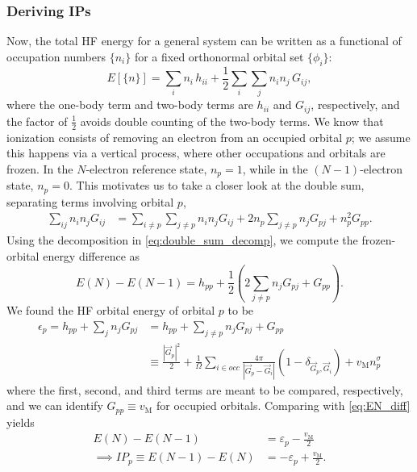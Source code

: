 \subsubsection{Deriving IPs}
 Now, the total HF energy for a general system can be written as a functional of
occupation numbers $\{n_i\}$ for a fixed orthonormal orbital set
$\{\phi_i\}$:
\begin{equation}
E[\{n\}]
=
\sum_i n_i\, h_{ii}
+
\frac{1}{2}
\sum_i
\sum_j
n_i n_j\, G_{ij},
\label{eq:HF_energy_occ}
\end{equation}
where the one-body term and two-body terms are $h_{ii}$ and $G_{ij}$,
respectively, and the factor of $\tfrac{1}{2}$ avoids double counting of the two-body terms. We know that ionization consists of removing an electron from an occupied orbital $p$; we assume this happens via a vertical process, where other occupations and orbitals are frozen. 
In the $N$-electron reference state, $n_p=1$, while in the $(N-1)$-electron
state, $n_p=0$. This motivates us to take a closer look at the double sum, separating terms involving orbital $p$,
\begin{align}
\sum_{ij} n_i n_j G_{ij}
&=
\sum_{i\neq p}\sum_{j\neq p} n_i n_j G_{ij}
+ 2 n_p \sum_{j\neq p} n_j G_{pj}
+ n_p^2 G_{pp}.
\label{eq:double_sum_decomp}
\end{align}
Using the decomposition in \ref{eq:double_sum_decomp}, we compute the frozen-orbital energy difference as
\begin{equation}
E(N) - E(N-1)
=
h_{pp}+ \frac{1}{2} \left(2\sum_{j\neq p} n_j G_{pj}+G_{pp} \right).
\label{eq:EN_diff}
\end{equation}
We found the HF orbital energy of orbital $p$ to be
\begin{align}
\epsilon_p
=
h_{pp}
+
\sum_j n_j G_{pj}
&=h_{pp}+\sum_{j\neq p} n_j G_{pj}+G_{pp} \\
&\equiv  \frac{|\vec{G}_p|^2}{2} +\frac{1}{\Omega} \sum_{i\in occ} \frac{4 \pi }{\left|\vec{G}_p-\vec{G}_i\right|} \left(1-\delta_{\vec{G}_p,\vec{G}_i}\right) + v_{\mathrm{M}}n^\sigma_{p}
\end{align}
where the first, second, and third terms are meant to be compared, respectively, and we can identify $G_{pp}\equiv v_{\mathrm{M}}$ for occupied orbitals. Comparing with \ref{eq:EN_diff} yields
\begin{align}
E(N) - E(N-1) &= \varepsilon_p - \frac{v_{\mathrm{M}}}{2}\\ \implies IP_{p} \equiv E(N-1) - E(N) &= -\varepsilon_p + \frac{v_{\mathrm{M}}}{2}.
\end{align}

